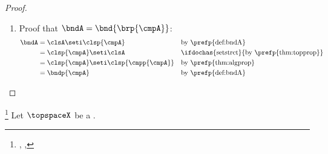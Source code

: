 \begin{proof}
\begin{enumerate}
  \item Proof that $\bndA=\bnd{\brp{\cmpA}}$:
    \begin{align*}
      \bndA
        &= \clsA \seti \clsp{\cmpA}
        && \text{by \prefp{def:bndA}}
      \\&= \clsp{\cmpA} \seti \clsA
        &&    \text{\ifdochas{setstrct}{by \prefp{thm:topprop}}}
      \\&= \clsp{\cmpA} \seti \clsp{\cmpp{\cmpA}}
        && \text{by \prefp{thm:algprop}}
      \\&= \bndp{\cmpA}
        && \text{by \prefp{def:bndA}}
    \end{align*}
\end{enumerate}
\end{proof}

\begin{theorem}
\footnote{
  ,
  , %
  }
\label{thm:intAclsAbndA}
Let $\topspaceX$ be a  .
\end{theorem}
